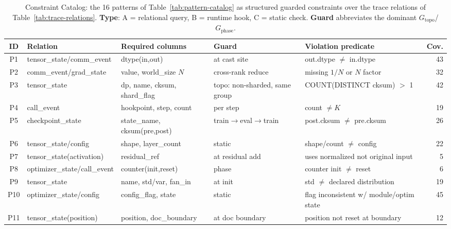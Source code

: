 \begin{table}[t]
\centering
\small
\caption{Constraint Catalog: the 16 patterns of Table~\ref{tab:pattern-catalog} as structured guarded constraints over the trace relations of Table~\ref{tab:trace-relations}. \textbf{Type}: A = relational query, B = runtime hook, C = static check. \textbf{Guard} abbreviates the dominant $G_{\text{topo}}$/$G_{\text{phase}}$.}
\label{tab:constraint-catalog}
\begin{tabular}{@{}cllll r@{}}
\toprule
\textbf{ID} & \textbf{Relation} & \textbf{Required columns} & \textbf{Guard} & \textbf{Violation predicate} & \textbf{Cov.} \\
\midrule
P1  & tensor\_state/comm\_event & dtype(in,out)            & at cast site            & out.dtype $\neq$ in.dtype                 & 43 \\
P2  & comm\_event/grad\_state   & value, world\_size $N$   & cross-rank reduce       & missing $1/N$ or $N$ factor               & 32 \\
P3  & tensor\_state             & dp, name, cksum, shard\_flag & topo: non-sharded, same group & COUNT(DISTINCT cksum) $>$ 1        & 42 \\
P4  & call\_event               & hookpoint, step, count   & per step                & count $\neq K$                            & 19 \\
P5  & checkpoint\_state         & state\_name, cksum(pre,post) & train$\to$eval$\to$train & post.cksum $\neq$ pre.cksum             & 26 \\
P6  & tensor\_state/config      & shape, layer\_count      & static                  & shape/count $\neq$ config                 & 22 \\
P7  & tensor\_state(activation) & residual\_ref            & at residual add         & uses normalized not original input        & 5  \\
P8  & optimizer\_state/call\_event & counter(init,reset)   & phase                   & counter init $\neq$ reset                  & 6  \\
P9  & tensor\_state             & name, std/var, fan\_in   & at init                 & std $\neq$ declared distribution           & 19 \\
P10 & optimizer\_state/config   & config\_flag, state      & static                  & flag inconsistent w/ module/optim state    & 45 \\
P11 & tensor\_state(position)   & position, doc\_boundary  & at doc boundary         & position not reset at boundary             & 12 \\

\end{tabular}
\end{table}
